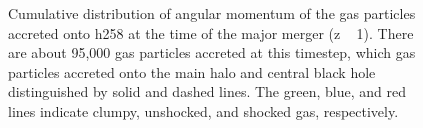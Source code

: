 \documentclass[manuscript]{aastex}
\begin{document}
\begin{figure}
\centerline{}
\caption[]{ Cumulative distribution of angular momentum of the gas particles accreted onto h258 at the time of the major merger (z ~ 1). There are about 95,000 gas particles accreted at this timestep, which gas particles accreted onto the main halo and central black hole distinguished by solid and dashed lines. The green, blue, and red lines indicate clumpy, unshocked, and shocked gas, respectively.}
\label{h258angmom_merger} 
\end{figure}
\end{document}
